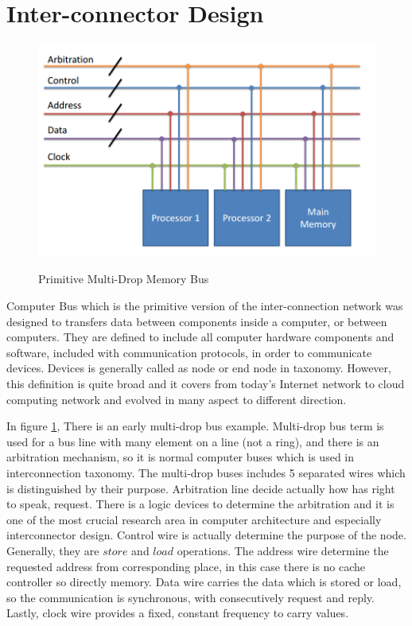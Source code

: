         \section{Inter-connector Design}
            \begin{figure}[h!]
                \centering
                \includegraphics[width=1\textwidth]{img/bus_primatives.png}
                \caption{Primitive Multi-Drop Memory Bus }
                \cite{ComputerArchCoursera}
                \label{fig:bus_primative}
            \end{figure}
            Computer Bus which is the primitive version of the inter-connection network was designed to transfers data between components inside a computer, or between computers. They are defined to include all computer hardware components and software, included with communication protocols, in order to communicate devices. Devices is generally called as node or end node in taxonomy. However, this definition is quite broad and it covers from today's Internet network to cloud computing network and evolved in many aspect to different direction.

            In figure \ref{fig:bus_primative}, There is an early multi-drop bus example. Multi-drop bus term is used for a bus line with many element on a line (not a ring), and there is an arbitration mechanism, so it is normal computer buses which is used in interconnection taxonomy. The multi-drop buses includes 5 separated wires which is distinguished by their purpose. Arbitration line decide actually how has right to speak, request. There is a logic devices to determine the arbitration and it is one of the most crucial research area in computer architecture and especially interconnector design\cite{hennessy2012computer}. Control wire is actually determine the purpose of the node. Generally, they are $store$ and $load$ operations. The address wire determine the requested address from corresponding place, in this case there is no cache controller so directly memory. Data wire carries the data which is stored or load, so the communication is synchronous, with consecutively request and reply. Lastly, clock wire provides a fixed, constant frequency to carry values.\cite{hennessy2012computer}

